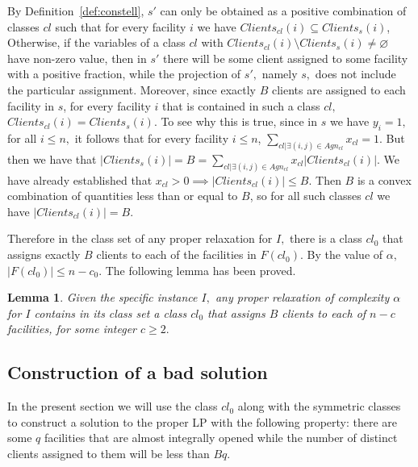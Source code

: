 \documentclass[11pt]{article}\usepackage{amsmath}
\newtheorem{lemma}{Lemma}[section]
\begin{document}
By Definition~\ref{def:constell},
$s'$ can only be obtained as a positive combination of classes $cl$ such that for
every    facility   $i$    we   have    $Clients_{cl}(i)   \subseteq
Clients_s(i)$, Otherwise,  if the variables  of a  class $cl$
with $Clients_{cl}(i)  \setminus  Clients_s(i) \neq \varnothing$ have  non-zero value,
then in $s'$ there will be  some client assigned to
some facility with a positive fraction, while the projection of $s',$ namely $s,$
does  not include  the
particular  assignment.  
Moreover,  since exactly $B$ clients are  assigned to each
facility in  $s$,   for every facility $i$
that   is  contained   in  such   a  class   $cl,$  $Clients_{cl}(i)=
Clients_s(i)$. To see why this  is true, 
since in  $s$ we have $y_i=1,$ for all $i\leq n,$   it follows  that for every facility $i\leq n$,
 $\sum_{cl  | \exists (i,j)  \in  Agn_{cl}} x_{cl}  =1$.  
But  then  we have  that
$|Clients_s(i)|=B=\sum_{cl  |   \exists  (i,j)  \in  Agn_{cl}}
x_{cl}|Clients_{cl}(i)|$.  We have already established   that $x_{cl}>0
\implies |Clients_{cl}(i)|  \leq B$. Then $B$ is  a convex combination
of quantities less than or equal to $B$, so for all such classes $cl$
we have $|Clients_{cl}(i)|=B$.


Therefore
in the class set of any proper relaxation for $I,$ there is 
a class $cl_0$ that assigns exactly $B$ clients to each of  the
facilities in $F(cl_0).$ By the value of $\alpha,$ 
 $|F(cl_0)| \leq n -c_0.$ The following
lemma has been proved. 


\iffalse     --- old version 
\begin{lemma}
There is a class $o$ that is contained in the class set of the proper
relaxation, that assigns $B$ clients to each of $n-c$ for some facilities.
\end{lemma}
\fi 
\begin{lemma}   \label{lemma:existence} 
Given the specific instance $I,$ any proper relaxation  of complexity
$\alpha$ for $I$ contains in its class set a class 
$cl_0$ that assigns $B$ clients to each of $n-c$ facilities, for some
integer  $c \geq 2.$ 
\end{lemma}


\subsection{Construction of a bad  solution}  
\label{subsec:badlbfl}

In the present section we will use the class $cl_0$ along with the
symmetric classes to construct a solution to the proper LP with 
the following
property: there are some  $q$ facilities   that
are almost integrally opened while the number of distinct  clients assigned to them will be less than $Bq$. 
\end{document}
